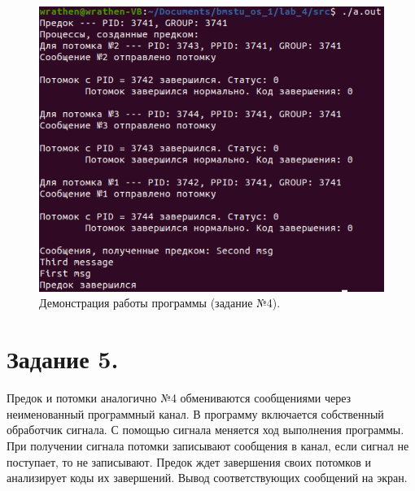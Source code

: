 \documentclass[12pt]{report}
\begin{document}
	\begin{figure}[H]
		
		\centering
		
		\includegraphics[width=\linewidth]{img/task_04.png}
		\caption{Демонстрация работы программы (задание №4).}
		
		\label{fig:task_04}
		
	\end{figure}

	\section*{Задание 5.}
	Предок и потомки аналогично №4 обмениваются сообщениями через неименованный программный канал.
	В программу включается собственный обработчик сигнала.
	С помощью сигнала меняется ход выполнения программы.
	При получении сигнала потомки записывают сообщения в канал, если сигнал не поступает, то не записывают.
	Предок ждет завершения своих потомков и анализирует коды их завершений.
	Вывод соответствующих сообщений на экран.
	
\end{document}
